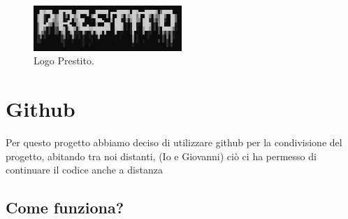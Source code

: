 \documentclass[a4paper,12pt]{article}
\begin{document}
\begin{figure}[h!]
    \centering
    \includegraphics[width=0.5\textwidth]{Prestito.png}
    \caption{Logo Prestito.}
    \label{fig:etichetta}
\end{figure}

\newpage

\section{Github}
Per questo progetto abbiamo deciso di utilizzare github per la condivisione del progetto,
abitando tra noi distanti, (Io e Giovanni) ciò ci ha permesso di continuare il codice anche a distanza

 \subsection{Come funziona?}
 
\end{document}
